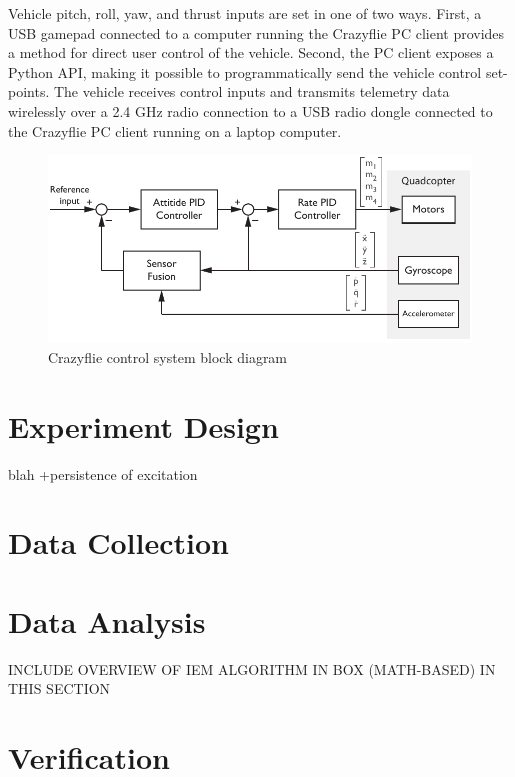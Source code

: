 Vehicle pitch, roll, yaw, and thrust inputs are set in one of two ways. First, a USB gamepad connected to a computer running the Crazyflie PC client provides a method for direct user control of the vehicle. Second, the PC client exposes a Python API, making it possible to programmatically send the vehicle control set-points. The vehicle receives control inputs and transmits telemetry data wirelessly over a 2.4 GHz radio connection to a USB radio dongle connected to the Crazyflie PC client running on a laptop computer.
\begin{figure}[htb!]
	\centering
	\includegraphics{../fig/crazyflie_control_system_block_diagram.pdf}
	\caption{Crazyflie control system block diagram}
\end{figure}

\section{Experiment Design}
blah
+persistence of excitation

\section{Data Collection}



\section{Data Analysis}
INCLUDE OVERVIEW OF IEM ALGORITHM IN BOX (MATH-BASED) IN THIS SECTION


\section{Verification}